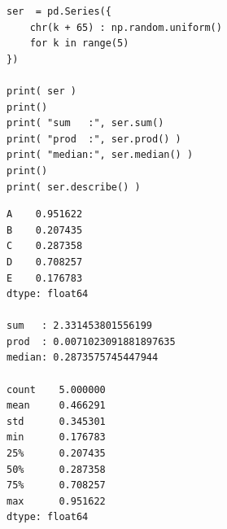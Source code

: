 
\begin{frame}[fragile]
%
\begin{tcbraster}[raster columns=2,
                  raster equal height,
                  nobeforeafter,
                  raster column skip=0.5cm]
\begin{codebox}
\begin{verbatim}
ser  = pd.Series({
    chr(k + 65) : np.random.uniform()
    for k in range(5)
})

print( ser )
print()
print( "sum   :", ser.sum()
print( "prod  :", ser.prod() )
print( "median:", ser.median() )
print()
print( ser.describe() )
\end{verbatim}
\end{codebox}
%
\begin{cmdbox}
\begin{verbatim}
A    0.951622
B    0.207435
C    0.287358
D    0.708257
E    0.176783
dtype: float64

sum   : 2.331453801556199
prod  : 0.0071023091881897635
median: 0.2873575745447944

count    5.000000
mean     0.466291
std      0.345301
min      0.176783
25%      0.207435
50%      0.287358
75%      0.708257
max      0.951622
dtype: float64
\end{verbatim}
\end{cmdbox}
\end{tcbraster}
%
\end{frame}


